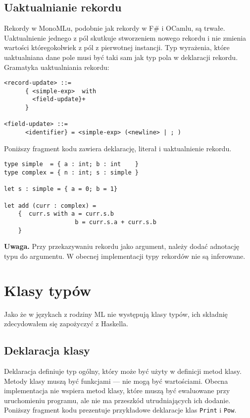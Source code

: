 \documentclass[declaration,shortabstract]{iithesis}
\begin{document}
\subsection{Uaktualnianie rekordu}

Rekordy w MonoMLu, podobnie jak rekordy w F\# i OCamlu, 
są trwałe. 
Uaktualnienie jednego z pól skutkuje stworzeniem nowego rekordu i nie zmienia 
wartości któregokolwiek z pól z pierwotnej instancji. 
Typ wyrażenia, które uaktualniana dane pole musi być taki sam jak typ pola 
w deklaracji rekordu.
Gramatyka uaktualniania rekordu:
\begin{lstlisting}[frame=lines]
<record-update> ::=
      { <simple-exp>  with 
        <field-update}+ 
      }

<field-update> ::=
      <identifier} = <simple-exp> (<newline> | ; )
\end{lstlisting}

Poniższy fragment kodu zawiera deklarację, literał i uaktualnienie rekordu.

\begin{lstlisting}[frame=lines]
type simple  = { a : int; b : int    }
type complex = { n : int; s : simple }

let s : simple = { a = 0; b = 1}

let add (curr : complex) = 
    {  curr.s with a = curr.s.b
                    b = curr.s.a + curr.s.b 
    }
\end{lstlisting}

\textbf{Uwaga.} Przy przekazywaniu rekordu jako argument, należy dodać 
adnotację typu do argumentu. W obecnej implementacji typy rekordów nie są 
inferowane.

\section{Klasy typów}

Jako że w językach z rodziny ML nie występują klasy typów, ich składnię
zdecydowałem się zapożyczyć z Haskella.

\subsection{Deklaracja klasy}

Deklaracja 
definiuje typ ogólny, który może być użyty w definicji metod klasy.
Metody klasy muszą być funkcjami --- nie mogą być wartościami. Obecna implementacja
nie wspiera metod klasy, które muszą być ewaluowane przy uruchomieniu programu, 
ale nie ma przeszkód utrudniających ich dodanie.
Poniższy fragment kodu prezentuje przykładowe deklaracje 
klas \texttt{Print} i \texttt{Pow}.
\end{document}

